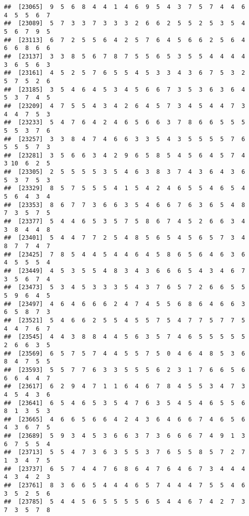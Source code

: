 \documentclass[
]{book}
\begin{document}
\begin{verbatim}
##  [23065]  9  5  6  8  4  4  1  4  6  9  5  4  3  7  5  7  4  4  6  4  5  5  6  7
##  [23089]  5  7  3  3  7  3  3  3  2  6  6  2  5  5  2  5  3  5  4  5  6  7  9  5
##  [23113]  6  7  2  5  5  6  4  2  5  7  6  4  5  6  6  2  5  6  4  6  6  8  6  6
##  [23137]  3  3  8  5  6  7  8  7  5  5  6  5  3  5  5  4  4  4  4  3  6  5  6  3
##  [23161]  4  5  2  5  7  6  5  5  4  5  3  3  4  3  6  7  5  3  2  5  7  5  2  6
##  [23185]  3  5  4  6  4  5  3  4  5  6  6  7  3  5  3  6  3  6  4  5  3  7  4  5
##  [23209]  4  7  5  5  4  3  4  2  6  4  5  7  3  4  5  4  4  7  3  4  4  7  5  3
##  [23233]  5  4  7  6  4  2  4  6  5  6  6  3  7  8  6  6  5  5  5  5  5  3  7  6
##  [23257]  3  3  8  4  7  4  6  6  3  3  5  4  3  5  5  5  5  7  6  5  5  5  7  3
##  [23281]  3  5  6  6  3  4  2  9  6  5  8  5  4  5  6  4  5  7  4  3 10  6  2  5
##  [23305]  2  5  5  5  5  3  5  4  6  3  8  3  7  4  3  6  4  3  6  5  3  7  5  3
##  [23329]  8  5  7  5  5  5  4  1  5  4  2  4  6  5  5  4  6  5  4  5  6  4  3  4
##  [23353]  8  6  7  7  3  6  6  3  5  4  6  6  7  6  3  6  5  4  8  7  3  5  7  5
##  [23377]  5  4  4  6  5  3  5  7  5  8  6  7  4  5  2  6  6  3  4  3  8  4  4  8
##  [23401]  5  4  4  7  7  2  5  4  8  5  6  5  4  5  6  5  7  3  4  8  7  7  4  7
##  [23425]  7  8  5  4  4  5  4  4  6  4  5  8  6  5  6  4  6  3  6  4  5  5  5  4
##  [23449]  4  5  3  5  5  4  8  3  4  3  6  6  6  5  4  3  4  6  7  3  5  6  7  4
##  [23473]  5  3  4  5  3  3  3  5  4  3  7  6  5  7  2  6  6  5  5  5  9  6  4  5
##  [23497]  4  6  4  6  6  6  2  4  7  4  5  5  6  8  6  4  6  6  3  6  5  8  7  3
##  [23521]  5  4  6  6  2  5  5  4  5  5  7  5  4  7  7  5  7  7  5  4  4  7  6  7
##  [23545]  4  4  3  8  8  4  4  5  6  3  5  7  4  6  5  5  5  5  5  2  6  6  3  5
##  [23569]  6  5  7  5  7  4  4  5  5  7  5  0  4  6  4  8  5  3  6  8  4  7  5  5
##  [23593]  5  5  7  7  6  3  3  5  5  5  6  2  3  1  7  6  6  5  6  6  6  4  4  7
##  [23617]  6  2  9  4  7  1  1  6  4  6  7  8  4  5  5  3  4  7  3  4  5  4  3  6
##  [23641]  6  5  4  6  5  3  5  4  7  6  3  5  4  5  4  6  5  5  6  8  1  3  5  3
##  [23665]  4  6  6  5  6  6  4  2  4  3  6  4  6  6  7  4  6  5  6  4  3  6  7  5
##  [23689]  5  9  3  4  5  3  6  6  3  7  3  6  6  6  7  4  9  1  3  6  7  5  5  4
##  [23713]  5  5  4  7  3  6  3  5  5  3  7  6  5  5  8  5  7  2  7  1  3  4  7  5
##  [23737]  6  5  7  4  4  7  6  8  6  4  7  6  4  6  7  3  4  4  4  4  3  4  2  3
##  [23761]  8  3  6  6  5  4  4  4  6  5  7  4  4  4  7  5  5  4  6  3  5  2  5  6
##  [23785]  5  4  4  5  6  5  5  5  5  6  5  4  4  6  7  4  2  7  3  7  3  5  7  8

\end{verbatim}
\end{document}
